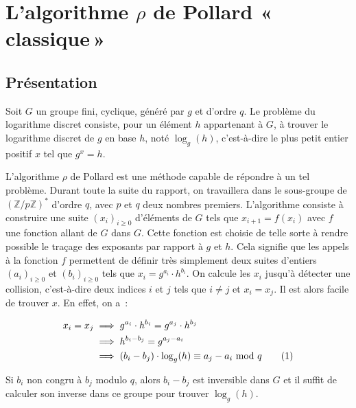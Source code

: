 \chapter{L'algorithme \texorpdfstring{$\rho$}{Rho} de Pollard «\texorpdfstring{\,}{\ }classique\texorpdfstring{\,}{\ }»}
    	\section{Présentation}
      Soit $G$ un groupe fini, cyclique, généré par $g$ et d'ordre $q$. Le problème du logarithme discret consiste, pour un élément $h$ appartenant à $G$, à trouver le logarithme discret de $g$ en base $h$, noté $\log_g(h)$, c'est-à-dire le plus petit entier positif $x$ tel que $g^x = h$.

    	L'algorithme $\rho$ de Pollard est une méthode capable de répondre à un tel problème. Durant toute la suite du rapport, on travaillera dans le sous-groupe de $(\mathbb{Z}/p\mathbb{Z})^*$ d'ordre $q$, avec $p$ et $q$ deux nombres premiers. L'algorithme consiste à construire une suite $(x_i)_{i \ge 0}$ d'éléments de $G$ tels que $x_{i+1} = f(x_i)$ avec $f$ une fonction allant de $G$ dans $G$. Cette fonction est choisie de telle sorte à rendre possible le traçage des exposants par rapport à $g$ et $h$. Cela signifie que les appels à la fonction $f$ permettent de définir très simplement deux suites d'entiers $(a_i)_{i \ge 0}$ et $(b_i)_{i \ge 0}$ tels que $x_i = g^{a_i} \cdot h^{b_i}$. On calcule les $x_i$ jusqu'à détecter une collision, c'est-à-dire deux indices $i$ et $j$ tels que $i \ne j$ et $x_i = x_j$. Il est alors facile de trouver $x$. En effet, on a~:

    	\begin{align*}
        x_i = x_j &\implies g^{a_i} \cdot h^{b_i} = g^{a_j} \cdot h^{b_j} \\
                  &\implies h^{b_i - b_j} = g^{a_j - a_i} \\
                  &\implies (b_i - b_j) \cdot \log_g(h) \equiv a_j - a_i \text{\ mod } q
                  \stepcounter{equation}\tag{\theequation}\label{eq:résolution}
        \end{align*}

      Si $b_i$ non congru à $b_j$ modulo $q$, alors $b_i - b_j$ est inversible dans $G$ et il suffit de calculer son inverse dans ce groupe pour trouver $\log_g(h)$.

